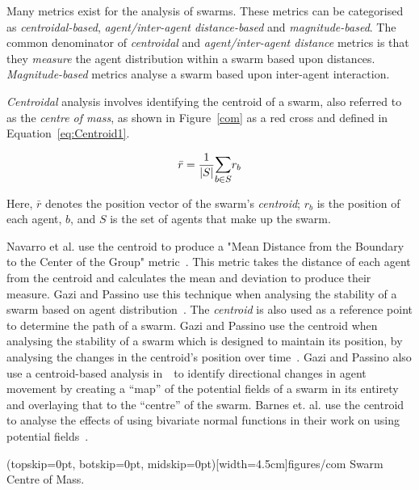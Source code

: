 \documentclass{ieeeaccess}
\newcommand{\card}[1]{\vert{#1}\vert}
\begin{document}
Many metrics exist for the analysis of swarms. These metrics can be categorised
as \textit{centroidal-based}, \textit{agent/inter-agent distance-based} and
\textit{magnitude-based}. The common denominator of \textit{centroidal} and
\textit{agent/inter-agent distance} metrics is that they \textit{measure} the
agent distribution within a swarm based upon distances.
\textit{Magnitude-based} metrics analyse a swarm based upon inter-agent
interaction. 

\textit{Centroidal} analysis involves identifying the centroid of a swarm, also
referred to as the \textit{centre of mass}, as shown in Figure~\ref{com} as a
red cross and defined in Equation~\ref{eq:Centroid1}. 

\begin{equation}\label{eq:Centroid1}
  \bar{r} = \frac{1}{\card{S}}\mathlarger{\sum_{b \in S}} r_b
\end{equation}

Here, $\bar{r}$ denotes the position vector of the swarm's \textit{centroid};
$r_b$ is the position of each agent, $b$, and $S$ is the set of agents that make
up the swarm.

Navarro et al. use the centroid to produce a "Mean Distance from the Boundary
to the Center of the Group" metric~\cite{NIM:09}. This metric takes the
distance of each agent from the centroid and calculates the mean and deviation
to produce their measure. Gazi and Passino use this technique when analysing
the stability of a swarm based on agent distribution~\cite{GP:11}. The
\textit{centroid} is also used as a reference point to determine the path of a
swarm. Gazi and Passino use the centroid when analysing the stability of a
swarm which is designed to maintain its position, by analysing the changes in
the centroid's position over time~\cite{GP:04}. Gazi and Passino also use a
centroid-based analysis in~\cite{GP:02}~to identify directional changes in
agent movement by creating a ``map'' of the potential fields of a swarm in its
entirety and overlaying that to the ``centre'' of the swarm.  Barnes et. al.
use the centroid to analyse the effects of using bivariate normal functions in
their work on using potential fields~\cite{BAF:06, BAFVM:06}. 

\Figure[t!](topskip=0pt, botskip=0pt, midskip=0pt)[width=4.5cm]{figures/com}
{Swarm Centre of Mass.\label{com}}
\end{document}
